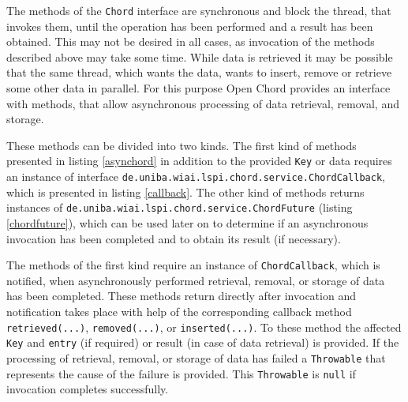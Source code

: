 The methods of the {\tt Chord} interface are synchronous and block the thread, that 
invokes them, until the operation has been performed and a result has been obtained. 
This may not be desired in all cases, as invocation of the methods described above 
may take some time. While data is retrieved it may be possible that the same thread, 
which wants the data, wants to insert, remove or retrieve some other data in parallel. 
For this purpose Open Chord provides an interface with methods, that allow 
asynchronous processing of data retrieval, removal, and storage. 

These methods can be divided into two kinds. The first kind of methods presented in 
listing \ref{asynchord} in addition to the provided {\tt Key} or data requires an 
instance of interface 
{\tt de.\-uniba.\-wiai.\-lspi.\-chord.\-service.\-ChordCallback}, which is presented 
in listing \ref{callback}. 
The other kind of methods returns instances of 
{\tt de.\-uniba.\-wiai.\-lspi.\-chord.\-service.\-ChordFuture} 
(listing \ref{chordfuture}), which can be used later on to determine if an 
asynchronous invocation has been completed and to obtain its result 
(if necessary). 


The methods of the first kind require an instance of {\tt ChordCallback}, which 
is notified, when asynchronously performed retrieval, removal, or storage of data 
has been completed. These methods return directly after invocation and notification 
takes place with help of the corresponding callback method {\tt retrieved(...)}, 
{\tt removed(...)}, or {\tt inserted(...)}. 
To these method the affected {\tt Key} and {\tt entry} (if required) or result 
(in case of data retrieval) is provided. If the processing of retrieval, removal, 
or storage of data has failed a {\tt Throwable} that represents the cause of 
the failure is provided. This {\tt Throwable} is {\tt null} if invocation 
completes successfully. 


